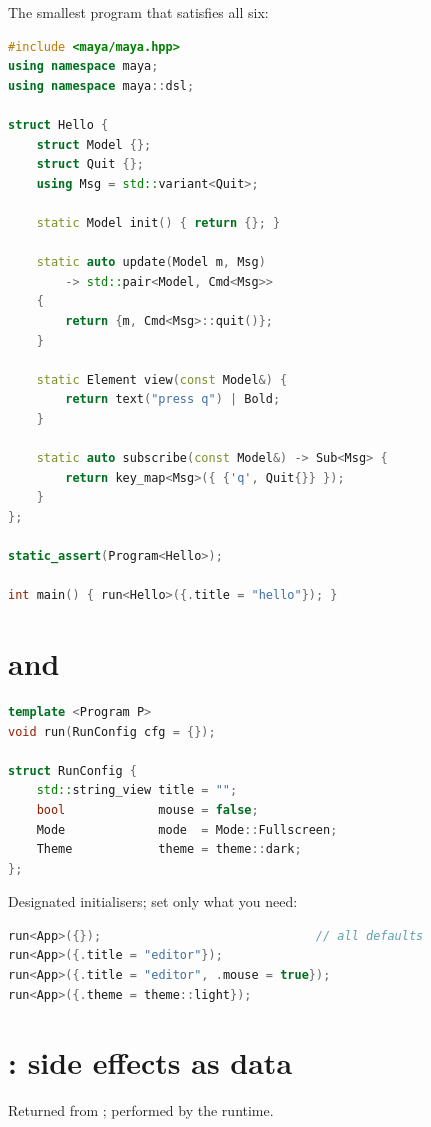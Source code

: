 \noindent The smallest program that satisfies all six:

\begin{lstlisting}[language=C++]
#include <maya/maya.hpp>
using namespace maya;
using namespace maya::dsl;

struct Hello {
    struct Model {};
    struct Quit {};
    using Msg = std::variant<Quit>;

    static Model init() { return {}; }

    static auto update(Model m, Msg)
        -> std::pair<Model, Cmd<Msg>>
    {
        return {m, Cmd<Msg>::quit()};
    }

    static Element view(const Model&) {
        return text("press q") | Bold;
    }

    static auto subscribe(const Model&) -> Sub<Msg> {
        return key_map<Msg>({ {'q', Quit{}} });
    }
};

static_assert(Program<Hello>);

int main() { run<Hello>({.title = "hello"}); }
\end{lstlisting}

\section{ and }

\begin{lstlisting}[language=C++]
template <Program P>
void run(RunConfig cfg = {});

struct RunConfig {
    std::string_view title = "";
    bool             mouse = false;
    Mode             mode  = Mode::Fullscreen;
    Theme            theme = theme::dark;
};
\end{lstlisting}

\noindent Designated initialisers; set only what you need:

\begin{lstlisting}[language=C++]
run<App>({});                              // all defaults
run<App>({.title = "editor"});
run<App>({.title = "editor", .mouse = true});
run<App>({.theme = theme::light});
\end{lstlisting}

\section{: side effects as data}

Returned from ; performed by the runtime.

